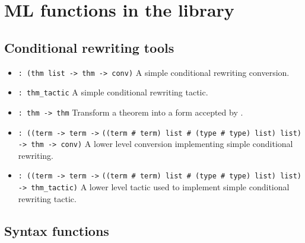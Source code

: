 \documentclass[12pt]{article}
\begin{document}
\section{ML functions in the library}

\subsection*{Conditional rewriting tools}

\begin{itemize}
\item {} \verb|: (thm list -> thm -> conv)|\newline
A simple conditional rewriting conversion.

\item {} \verb|: thm_tactic|\newline
A simple conditional rewriting tactic.

\item {} \verb|: thm -> thm|\newline
Transform a theorem into a form accepted by .

\item {} \linebreak
\verb|: ((term -> term ->| \verb|((term # term) list # (type # type) list) list)|
\verb| -> thm -> conv)|\newline
A lower level conversion implementing simple conditional rewriting.

\item {}\linebreak
\verb|: ((term -> term ->| \verb|((term # term) list # (type # type) list) list)|
\verb|-> thm_tactic)|\newline
A lower level tactic used to implement simple conditional rewriting tactic.
\end{itemize}

\subsection*{Syntax functions}
\end{document}
